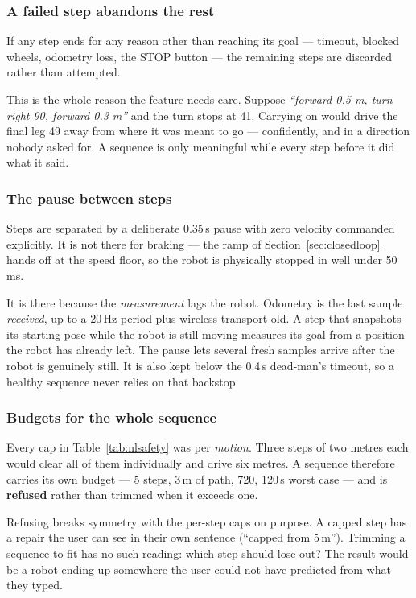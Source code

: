 \documentclass[11pt,a4paper]{article}
\begin{document}
\subsubsection{A failed step abandons the rest}
If any step ends for any reason other than reaching its goal --- timeout,
blocked wheels, odometry loss, the STOP button --- the remaining steps are
discarded rather than attempted.

This is the whole reason the feature needs care. Suppose \emph{``forward 0.5 m,
turn right 90\textdegree, forward 0.3 m''} and the turn stops at 41\textdegree.
Carrying on would drive the final leg 49\textdegree{} away from where it was
meant to go --- confidently, and in a direction nobody asked for. A sequence is
only meaningful while every step before it did what it said.

\subsubsection{The pause between steps}
Steps are separated by a deliberate 0.35\,s pause with zero velocity commanded
explicitly. It is not there for braking --- the ramp of
Section~\ref{sec:closedloop} hands off at the speed floor, so the robot is
physically stopped in well under 50\,ms.

It is there because the \emph{measurement} lags the robot. Odometry is the last
sample \emph{received}, up to a 20\,Hz period plus wireless transport old. A step
that snapshots its starting pose while the robot is still moving measures its
goal from a position the robot has already left. The pause lets several fresh
samples arrive after the robot is genuinely still. It is also kept below the
0.4\,s dead-man's timeout, so a healthy sequence never relies on that backstop.

\subsubsection{Budgets for the whole sequence}
Every cap in Table~\ref{tab:nlsafety} was per \emph{motion}. Three steps of two
metres each would clear all of them individually and drive six metres. A
sequence therefore carries its own budget --- 5 steps, 3\,m of path, 720\textdegree,
120\,s worst case --- and is \textbf{refused} rather than trimmed when it
exceeds one.

Refusing breaks symmetry with the per-step caps on purpose. A capped step has a
repair the user can see in their own sentence (``capped from 5\,m''). Trimming a
sequence to fit has no such reading: which step should lose out? The result
would be a robot ending up somewhere the user could not have predicted from what
they typed.
\end{document}
